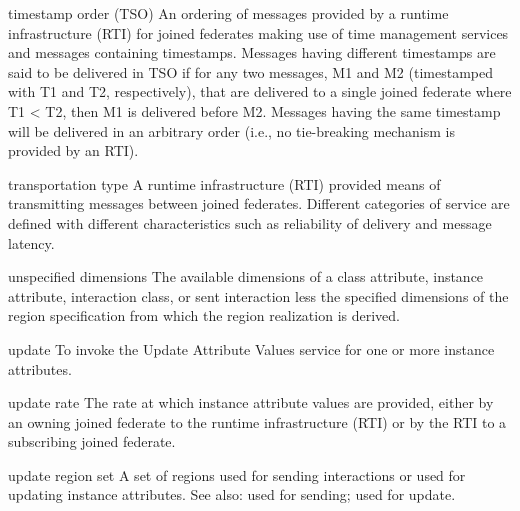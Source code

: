 \begin{definition}{timestamp order (TSO)}
    An ordering of messages provided by a runtime infrastructure (RTI) for joined federates making use of time management services and messages containing timestamps. Messages having different timestamps are said to be delivered in TSO if for any two messages, M1 and M2 (timestamped with T1 and T2, respectively), that are delivered to a single joined federate where T1 \textless{} T2, then M1 is delivered before M2. Messages having the same timestamp will be delivered in an arbitrary order (i.e., no tie-breaking mechanism is provided by an RTI).
\end{definition}

\begin{definition}{transportation type}
    A runtime infrastructure (RTI) provided means of transmitting messages between joined federates. Different categories of service are defined with different characteristics such as reliability of delivery and message latency.
\end{definition}

\begin{definition}{unspecified dimensions}
    The available dimensions of a class attribute, instance attribute, interaction class, or sent interaction less the specified dimensions of the region specification from which the region realization is derived.
\end{definition}


\begin{definition}{update}
    To invoke the Update Attribute Values service for one or more instance attributes.
\end{definition}


\begin{definition}{update rate}
    The rate at which instance attribute values are provided, either by an owning joined federate to the runtime infrastructure (RTI) or by the RTI to a subscribing joined federate.
\end{definition}

\newpage
\begin{definition}{update region set}
    A set of regions used for sending interactions or used for updating instance attributes. See also: used for sending; used for update.
\end{definition}

